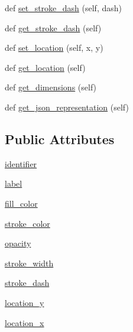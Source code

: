 \begin{DoxyCompactItemize}
\item 
def \mbox{\hyperlink{classbridges_1_1symbol_1_1_symbol_a8d49beeedd02896c0e8906f0e55ee649}{set\+\_\+stroke\+\_\+dash}} (self, dash)
\item 
def \mbox{\hyperlink{classbridges_1_1symbol_1_1_symbol_a40483163e3edee42a949273da9febdba}{get\+\_\+stroke\+\_\+dash}} (self)
\item 
def \mbox{\hyperlink{classbridges_1_1symbol_1_1_symbol_a297177b4a8b29c989834d55b9c03db66}{set\+\_\+location}} (self, x, y)
\item 
def \mbox{\hyperlink{classbridges_1_1symbol_1_1_symbol_a8abbc9a5c77eb7e2ef40338102a145c4}{get\+\_\+location}} (self)
\item 
def \mbox{\hyperlink{classbridges_1_1symbol_1_1_symbol_ae53057317f11148bbbf7c17c671cac2d}{get\+\_\+dimensions}} (self)
\item 
def \mbox{\hyperlink{classbridges_1_1symbol_1_1_symbol_a746f8e6d1fd1c63c8a9140a2af7436f8}{get\+\_\+json\+\_\+representation}} (self)
\end{DoxyCompactItemize}
\subsection*{Public Attributes}
\begin{DoxyCompactItemize}
\item 
\mbox{\hyperlink{classbridges_1_1symbol_1_1_symbol_a41f5ae0b9a8986e80c74012836531878}{identifier}}
\item 
\mbox{\hyperlink{classbridges_1_1symbol_1_1_symbol_a99c341040ad20f6059d10f065c3ddd44}{label}}
\item 
\mbox{\hyperlink{classbridges_1_1symbol_1_1_symbol_a8cb7230fa72c8b02e01e4dbb5b1c466d}{fill\+\_\+color}}
\item 
\mbox{\hyperlink{classbridges_1_1symbol_1_1_symbol_a84e683ce380b5f84f3dbd576f605641f}{stroke\+\_\+color}}
\item 
\mbox{\hyperlink{classbridges_1_1symbol_1_1_symbol_a3f514659f07604d4c41de7de28da7e73}{opacity}}
\item 
\mbox{\hyperlink{classbridges_1_1symbol_1_1_symbol_a413998c84c07b9d76402c250579b5023}{stroke\+\_\+width}}
\item 
\mbox{\hyperlink{classbridges_1_1symbol_1_1_symbol_a131fa9e38a941596d597e8c454ffd8f4}{stroke\+\_\+dash}}
\item 
\mbox{\hyperlink{classbridges_1_1symbol_1_1_symbol_a7633629d27a7f725c7f1219c48c26b1c}{location\+\_\+y}}
\item 
\mbox{\hyperlink{classbridges_1_1symbol_1_1_symbol_a848064d8824b4f2b6deebaa3dc7086f2}{location\+\_\+x}}
\end{DoxyCompactItemize}
